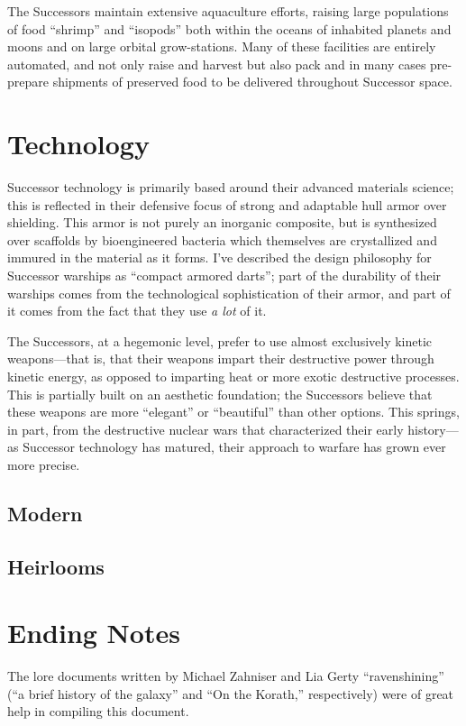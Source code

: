 \documentclass[11pt]{report}
\begin{document}
    The Successors maintain extensive aquaculture efforts, raising large populations of food ``shrimp'' and ``isopods'' both within the oceans of inhabited planets and moons and on large orbital grow-stations. Many of these facilities are entirely automated, and not only raise and harvest but also pack and in many cases pre-prepare shipments of preserved food to be delivered throughout Successor space.
    
    \section{Technology}
    Successor technology is primarily based around their advanced materials science; this is reflected in their defensive focus of strong and adaptable hull armor over shielding. This armor is not purely an inorganic composite, but is synthesized over scaffolds by bioengineered bacteria which themselves are crystallized and immured in the material as it forms. I've described the design philosophy for Successor warships as ``compact armored darts''; part of the durability of their warships comes from the technological sophistication of their armor, and part of it comes from the fact that they use \emph{a lot} of it.

    The Successors, at a hegemonic level, prefer to use almost exclusively kinetic weapons---that is, that their weapons impart their destructive power through kinetic energy, as opposed to imparting heat or more exotic destructive processes. This is partially built on an aesthetic foundation; the Successors believe that these weapons are more ``elegant'' or ``beautiful'' than other options. This springs, in part, from the destructive nuclear wars that characterized their early history---as Successor technology has matured, their approach to warfare has grown ever more precise.

    \subsection{Modern}
    \subsection{Heirlooms}
    \section{Ending Notes}
    The lore documents written by Michael Zahniser and Lia Gerty ``ravenshining'' (``a brief history of the galaxy'' and ``On the Korath,'' respectively) were of great help in compiling this document.
\end{document}
